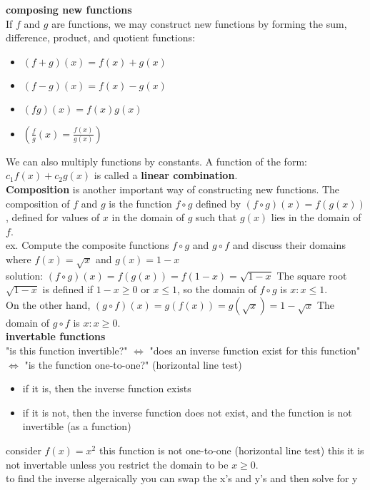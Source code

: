 \documentclass{article}
\begin{document}
\textbf{composing new functions}\\
	If $f$ and $g$ are functions, we may construct new functions by forming the sum, difference, product, and quotient functions:\\
	\begin{itemize}
		\item $(f + g)(x) = f(x) + g(x)$
		\item $(f - g)(x) = f(x) - g(x)$
		\item $(fg)(x) = f(x)g(x)$
		\item $(\frac{f}{g}(x) = \frac{f(x)}{g(x)})$
	\end{itemize}
	We can also multiply functions by constants. A function of the form: $c_1f(x) + c_2g(x)$ is called a \textbf{linear combination}.\\
	\textbf{Composition} is another important way of constructing new functions. The composition of $f$ and $g$ is the function $f \circ g$ defined by $(f \circ g)(x) = f(g(x))$, defined for values of $x$ in the domain of $g$ such that $g(x)$ lies in the domain of $f$.\\
	ex. Compute the composite functions $f \circ g$ and $g \circ f$ and discuss their domains where $f(x) = \sqrt{x}$ and $g(x) = 1 - x$\\
	solution: $(f \circ g)(x) = f(g(x)) = f(1 - x) = \sqrt{1 - x}$ The square root $\sqrt{1 - x}$ is defined if $1 - x \geq 0$ or $x \leq 1$, so the domain of $f \circ g$ is ${x : x \leq 1}$.\\
	On the other hand, $(g \circ f)(x) = g(f(x)) = g(\sqrt{x}) = 1 - \sqrt{x}$ The domain of $g \circ f$ is ${x : x \geq 0}$.\\

\textbf{invertable functions}\\
	"is this function invertible?" $\Leftrightarrow$ "does an inverse function exist for this function" $\Leftrightarrow$ "is the function one-to-one?" (horizontal line test)
	\begin{itemize}
		\item if it is, then the inverse function exists
		\item if it is not, then the inverse function does not exist, and the function is not invertible (as a function)
	\end{itemize}
	consider $f(x) = x^2$ this function is not one-to-one (horizontal line test) this it is not invertable unless you restrict the domain to be $x \geq 0$.\\
	to find the inverse algeraically you can swap the x's and y's and then solve for y\\
\end{document}
